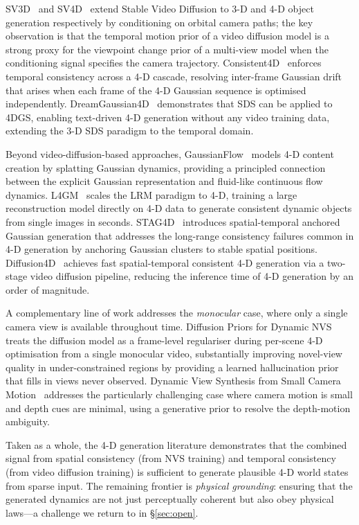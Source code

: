 SV3D~\citep{voleti2024sv3d} and SV4D~\citep{xie2024sv4d} extend Stable
Video Diffusion to 3-D and 4-D object generation respectively by conditioning
on orbital camera paths; the key observation is that the temporal motion
prior of a video diffusion model is a strong proxy for the viewpoint
change prior of a multi-view model when the conditioning signal specifies
the camera trajectory.
Consistent4D~\citep{jiang2024consistent4d} enforces temporal consistency
across a 4-D cascade, resolving inter-frame Gaussian drift that arises
when each frame of the 4-D Gaussian sequence is optimised independently.
DreamGaussian4D~\citep{ren2023dreamgaussian4d} demonstrates that SDS can
be applied to 4DGS, enabling text-driven 4-D generation without any video
training data, extending the 3-D SDS paradigm to the temporal domain.

Beyond video-diffusion-based approaches, GaussianFlow~\citep{gao2024gaussianflow}
models 4-D content creation by splatting Gaussian dynamics, providing a
principled connection between the explicit Gaussian representation and
fluid-like continuous flow dynamics.
L4GM~\citep{ren2024l4gm} scales the LRM paradigm to 4-D, training a large
reconstruction model directly on 4-D data to generate consistent dynamic
objects from single images in seconds.
STAG4D~\citep{zeng2024stag4d} introduces spatial-temporal anchored Gaussian
generation that addresses the long-range consistency failures common in
4-D generation by anchoring Gaussian clusters to stable spatial positions.
Diffusion4D~\citep{diffusion4d2024} achieves fast spatial-temporal consistent
4-D generation via a two-stage video diffusion pipeline, reducing the
inference time of 4-D generation by an order of magnitude.

A complementary line of work addresses the \emph{monocular} case, where
only a single camera view is available throughout time.
Diffusion Priors for Dynamic NVS~\citep{li2024diffpriordynamic} treats the
diffusion model as a frame-level regulariser during per-scene 4-D optimisation
from a single monocular video, substantially improving novel-view quality in
under-constrained regions by providing a learned hallucination prior that
fills in views never observed.
Dynamic View Synthesis from Small Camera Motion~\citep{li2024smallmotion}
addresses the particularly challenging case where camera motion is small and
depth cues are minimal, using a generative prior to resolve the depth-motion
ambiguity.

Taken as a whole, the 4-D generation literature demonstrates that the combined
signal from spatial consistency (from NVS training) and temporal consistency
(from video diffusion training) is sufficient to generate plausible 4-D world
states from sparse input.
The remaining frontier is \emph{physical grounding}: ensuring that the
generated dynamics are not just perceptually coherent but also obey physical
laws---a challenge we return to in \S\ref{sec:open}.

